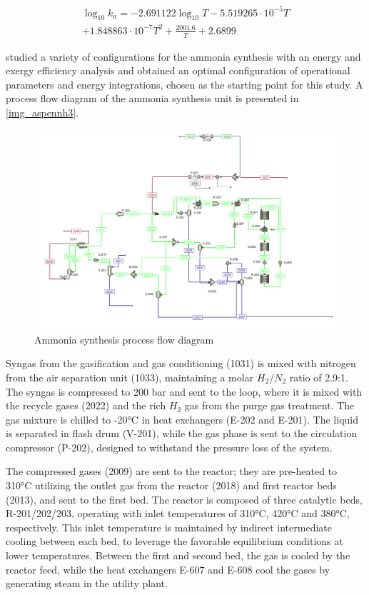 \documentclass[a4paper, titlepage]{article}
\begin{document}
\begin{multline}
    \log_{10}k_a = -2.691122\log_{10}T - 5.519265\cdot10^{-5}T \\
    + 1.848863\cdot10^{-7}T^2 + \frac{2001.6}{T} + 2.6899 \label{eq_ammonia3}
\end{multline}

\textcite{florez-orregoProcessSynthesisOptimization2018} studied a variety of configurations for the ammonia synthesis
with an energy and exergy efficiency analysis and obtained an optimal configuration of operational parameters and
energy integrations, chosen as the starting point for this study. A process flow diagram of the ammonia synthesis
unit is presented in \autoref{img_aspennh3}.

\begin{figure}[htb]
    \includegraphics[width=\textwidth]{img/aspen_nh3.png}
    \caption{Ammonia synthesis process flow diagram}
    \label{img_aspennh3}
\end{figure}

Syngas from the gasification and gas conditioning (1031) is mixed with nitrogen from the air separation unit (1033),
maintaining a molar $H_2/N_2$ ratio of 2.9:1. The syngas is compressed to 200 bar and sent to the loop, where it is
mixed with the recycle gases (2022) and the rich $H_2$ gas from the purge gas treatment. The gas mixture is chilled to
-20°C in heat exchangers (E-202 and E-201). The liquid is separated in flash drum (V-201), while the gas phase is sent
to the circulation compressor (P-202), designed to withstand the pressure loss of the system.

The compressed gases (2009) are sent to the reactor; they are pre-heated to 310°C utilizing the outlet gas from the
reactor (2018) and first reactor beds (2013), and sent to the first bed. The reactor is composed of three catalytic
beds, R-201/202/203, operating with inlet temperatures of 310°C, 420°C and 380°C, respectively. This inlet temperature
is maintained by indirect intermediate cooling between each bed, to leverage the favorable equilibrium conditions at
lower temperatures. Between the first and second bed, the gas is cooled by the reactor feed, while the heat exchangers
E-607 and E-608 cool the gases by generating steam in the utility plant.
\end{document}
